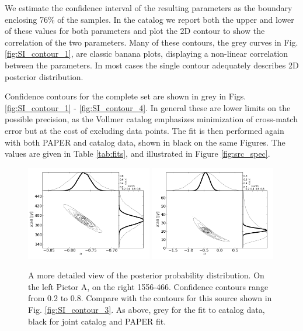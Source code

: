 \documentclass[preprint]{aastex}
\begin{document}
We estimate the confidence interval of the resulting parameters as the boundary
enclosing 76\% of the samples. In the catalog we report both the upper and
lower of these values for both parameters and plot the 2D contour to show the
correlation of the two parameters. Many of these contours, the grey curves in
Fig. \ref{fig:SI_contour_1}, are classic banana plots, displaying a non-linear
correlation between the parameters.    In most cases the single contour
adequately describes 2D posterior distribution.

Confidence contours for
the complete set are shown in grey in Figs. \ref{fig:SI_contour_1} -
\ref{fig:SI_contour_4}.  In general these are lower limits on the possible
precision, as the Vollmer catalog emphasizes minimization of cross-match error
but at the cost of excluding data points.  The fit is then performed again with
both PAPER and catalog data, shown in black on the same Figures. The values are
given in Table \ref{tab:fits}, and
illustrated in Figure \ref{fig:src_spec}.  






\begin{figure}[htbp]
\includegraphics[width=0.49\textwidth]{plots/pic_trace_hist.png}
\includegraphics[width=0.49\textwidth]{plots/1556-466_trace_hist.png}
\caption{
A more detailed view of the posterior probability distribution. On the left
Pictor A, on the right 1556-466. Confidence contours range from 0.2 to 0.8.
Compare with the contours for this source shown in Fig. \ref{fig:SI_contour_3}.
As above, grey for  the fit to catalog data, black for joint catalog and PAPER
fit.
}
\end{figure}
\end{document}
